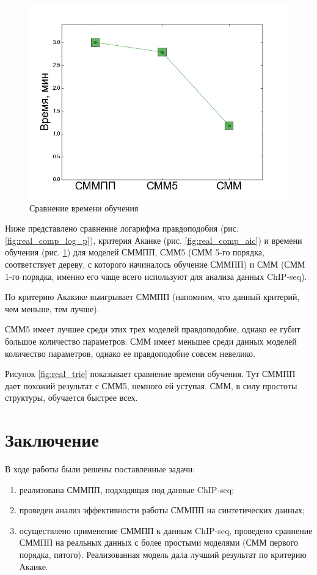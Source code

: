 \documentclass{matmex-diploma-custom}
\begin{document}
\begin{figure}[h!]
\begin{minipage}[b]{0.32 \textwidth}
	\includegraphics[scale=0.28]{img/real/time.png}
	\centering
	\caption{ Сравнение времени обучения }
	\label{fig:real_comp_time}
\end{minipage}
\end{figure}

Ниже представлено сравнение логарифма правдоподобия (рис. \ref{fig:real_comp_log_p}), критерия Акаике (рис. \ref{fig:real_comp_aic}) и времени обучения (рис. \ref{fig:real_comp_time}) для моделей СММПП, СММ5 (СММ 5-го порядка, соответствует дереву, с которого начиналось обучение СММПП) и СММ (СММ 1-го порядка, именно его чаще всего используют для анализа данных ChIP-seq).

По критерию Акакике выигрывает СММПП (напомним, что данный критерий, чем меньше, тем лучше).

СММ5 имеет лучшее среди этих трех моделей правдоподобие, однако ее губит большое количество параметров. 
СММ имеет меньшее среди данных моделей количество параметров, однако ее правдоподобие совсем невелико.

Рисунок \ref{fig:real_trie} показывает сравнение времени обучения. Тут СММПП дает похожий результат с СММ5, немного ей уступая. СММ, в силу простоты структуры, обучается быстрее всех.


\section*{Заключение}
В ходе работы были решены поставленные задачи:
\begin{enumerate}
\item
реализована СММПП, подходящая под данные ChIP-seq;
\item
проведен анализ эффективности работы СММПП на
синтетических данных; 
\item
осуществлено применение СММПП к
данным ChIP-seq, проведено сравнение СММПП на реальных данных с более простыми моделями (СММ первого порядка, пятого). Реализованная модель дала лучший результат по критерию Акаике.
\end{enumerate}






\end{document}
